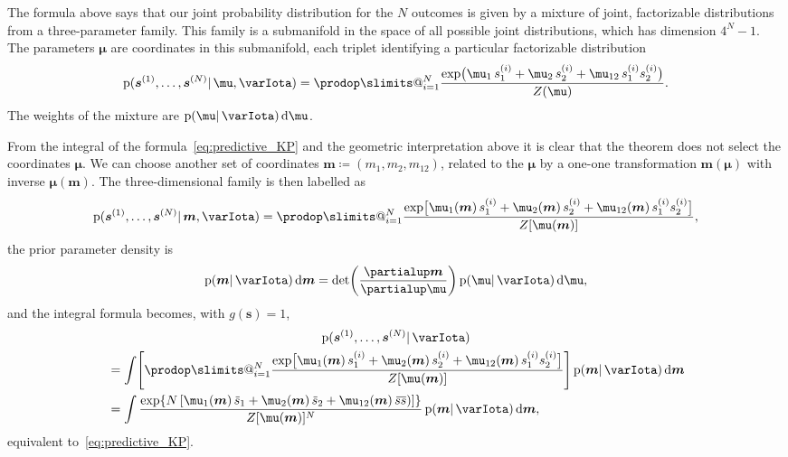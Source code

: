 \documentclass[\ifafour a4paper,12pt,\else a5paper,10pt,\fi%
onecolumn,oneside,article,%
british%
]{memoir}
\makeatletter
\theoremstyle{remark}
\theoremstyle{innote}
\def\prod{\DOTSI\prodop\slimits@}
\newcommand*{\de}{\partialup}%
\newcommand*{\di}{\mathrm{d}}%
\newcommand*{\defd}{\coloneqq}
\newcommand*{\pf}{\mathrm{p}}%
\renewcommand*{\|}{\mathpunct{|}}
\newcommand*{\widebar}[1]{{\mkern1.5mu\skew{2}\overline{\mkern-1.5mu#1\mkern-1.5mu}\mkern 1.5mu}}
\newcommand*{\yI}{\varIota}
\newcommand*{\ys}{\bm{s}}
\newcommand*{\yso}[1]{\ys^{(#1)}}
\newcommand*{\ysso}[1]{s^{(#1)}}
\newcommand*{\la}{\mu_{12}}
\newcommand*{\yth}{\bm{\mu}}
\newcommand*{\yt}{\bm{m}}
\newcommand*{\yl}{m_{12}}
\newcommand*{\yavv}{\widebar{s}}
\newcommand*{\ycv}{\widebar{ss}}
\makeatother
\begin{document}
The formula above says that our joint probability distribution for the $N$
outcomes is given by a mixture of joint, factorizable distributions from a
three-parameter family. This family is a submanifold in the space of all
possible joint distributions, which has dimension $4^N-1$. The parameters
$\yth$ are coordinates in this submanifold, each triplet identifying a
particular factorizable distribution
\begin{equation}
  \label{eq:extreme_distributions}
    \pf(\yso{1}, \dotsc, \yso{N} \|\yth, \yI ) =
  \prod_{i=1}^{N}
  \frac{  \exp\bigl(
    \mu_1\, \ysso{i}_1 + \mu_2\, \ysso{i}_2 + \la\, \ysso{i}_1 \ysso{i}_2
    \bigr) }{Z(\yth)}.
\end{equation}
The weights of the mixture are $\pf(\yth \|\yI)\,\di\yth $.

From the integral of the formula~\eqref{eq:predictive_KP} and the geometric
interpretation above it is clear that the theorem does not select the
coordinates $\yth$. We can choose another set of coordinates
$\yt \defd (m_1,m_2,\yl)$, related to the $\yth$ by a one-one
transformation $\yt(\yth)$ with inverse $\yth(\yt)$. The three-dimensional
family is then labelled as
\begin{equation}
  \label{eq:extreme_distributions_relabelled}
    \pf(\yso{1}, \dotsc, \yso{N} \|\yt, \yI ) =
  \prod_{i=1}^{N}
  \frac{  \exp\bigl[ 
    \mu_1(\yt)\, \ysso{i}_1 + \mu_2(\yt)\, \ysso{i}_2 +
    \la(\yt)\, \ysso{i}_1 \ysso{i}_2
    \bigr] }{Z[\yth(\yt)]},
\end{equation}
the prior parameter density is
\begin{equation}
  \label{eq:density_new_coords}
  \pf(\yt \|\yI)\,\di\yt  =
  \det\biggl( \frac{\de\yt}{\de\yth}\biggr)\, \pf(\yth \| \yI)\,\di\yth ,
\end{equation}
and the integral formula becomes, with $g(\ys)=1$,
\begin{multline}
  \label{eq:predictive_KP}
  \pf(\yso{1}, \dotsc, \yso{N} \|\yI )
  \\
\begin{aligned}
  &=\int
\Biggl[  \prod_{i=1}^{N}
  \frac{  \exp\bigl[ 
    \mu_1(\yt)\, \ysso{i}_1 + \mu_2(\yt)\, \ysso{i}_2 +
    \la(\yt)\, \ysso{i}_1 \ysso{i}_2
    \bigr] }{Z[\yth(\yt)]}
  \Biggr]\,
  \pf(\yt \| \yI)\,\di\yt 
\\
  &=\int
  \frac{  \exp\{N \, [
    \mu_1(\yt)\, \yavv_1 + \mu_2(\yt)\, \yavv_2 +
    \la(\yt)\, \ycv)]\}}{Z[\yth(\yt)]^N}
\,  \pf(\yt \| \yI)\,\di\yt ,
\end{aligned}
\end{multline}
equivalent to~\eqref{eq:predictive_KP}.
\end{document}
